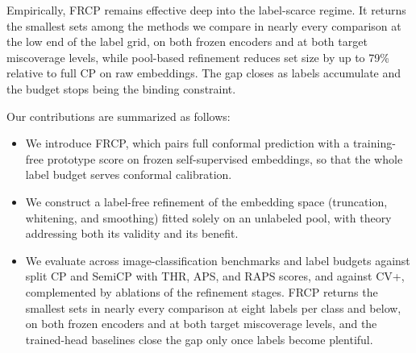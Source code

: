 Empirically, FRCP remains effective deep into the label-scarce regime. It returns the smallest sets among the methods we compare in nearly every comparison at the low end of the label grid, on both frozen encoders and at both target miscoverage levels, while pool-based refinement reduces set size by up to 79\% relative to full CP on raw embeddings. The gap closes as labels accumulate and the budget stops being the binding constraint.

Our contributions are summarized as follows:
\begin{itemize}
\item We introduce FRCP, which pairs full conformal prediction with a training-free prototype score on frozen self-supervised embeddings, so that the whole label budget serves conformal calibration.
\item We construct a label-free refinement of the embedding space (truncation, whitening, and smoothing) fitted solely on an unlabeled pool, with theory addressing both its validity and its benefit.
\item We evaluate across image-classification benchmarks and label budgets against split CP and SemiCP with THR, APS, and RAPS scores, and against CV+, complemented by ablations of the refinement stages. FRCP returns the smallest sets in nearly every comparison at eight labels per class and below, on both frozen encoders and at both target miscoverage levels, and the trained-head baselines close the gap only once labels become plentiful.
\end{itemize}
